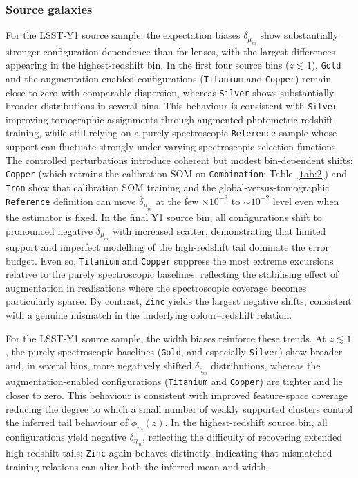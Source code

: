 \subsubsection{Source galaxies} \label{sec:4.4.2}

For the LSST-Y1 source sample, the expectation biases \(\delta_{\mu_m}\) show substantially stronger configuration dependence than for lenses, with the largest differences appearing in the highest-redshift bin. In the first four source bins (\(z \lesssim 1\)), \texttt{Gold} and the augmentation-enabled configurations (\texttt{Titanium} and \texttt{Copper}) remain close to zero with comparable dispersion, whereas \texttt{Silver} shows substantially broader distributions in several bins. This behaviour is consistent with \texttt{Silver} improving tomographic assignments through augmented photometric-redshift training, while still relying on a purely spectroscopic \texttt{Reference} sample whose support can fluctuate strongly under varying spectroscopic selection functions. The controlled perturbations introduce coherent but modest bin-dependent shifts: \texttt{Copper} (which retrains the calibration SOM on \texttt{Combination}; Table~\ref{tab:2}) and \texttt{Iron} show that calibration SOM training and the global-versus-tomographic \texttt{Reference} definition can move \(\bar{\delta}_{\mu_m}\) at the few \(\times 10^{-3}\) to \(\sim 10^{-2}\) level even when the estimator is fixed. In the final Y1 source bin, all configurations shift to pronounced negative \(\delta_{\mu_m}\) with increased scatter, demonstrating that limited support and imperfect modelling of the high-redshift tail dominate the error budget. Even so, \texttt{Titanium} and \texttt{Copper} suppress the most extreme excursions relative to the purely spectroscopic baselines, reflecting the stabilising effect of augmentation in realisations where the spectroscopic coverage becomes particularly sparse. By contrast, \texttt{Zinc} yields the largest negative shifts, consistent with a genuine mismatch in the underlying colour--redshift relation.

For the LSST-Y1 source sample, the width biases reinforce these trends. At \(z \lesssim 1\), the purely spectroscopic baselines (\texttt{Gold}, and especially \texttt{Silver}) show broader and, in several bins, more negatively shifted \(\delta_{\eta_m}\) distributions, whereas the augmentation-enabled configurations (\texttt{Titanium} and \texttt{Copper}) are tighter and lie closer to zero. This behaviour is consistent with improved feature-space coverage reducing the degree to which a small number of weakly supported clusters control the inferred tail behaviour of \(\phi_m(z)\). In the highest-redshift source bin, all configurations yield negative \(\delta_{\eta_m}\), reflecting the difficulty of recovering extended high-redshift tails; \texttt{Zinc} again behaves distinctly, indicating that mismatched training relations can alter both the inferred mean and width.

